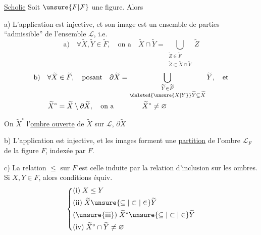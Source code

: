 \uline{Scholie}  Soit $\unsure{F|\mathcal F}$ une figure. Alors

a) L'application
est injective, et son image  est un ensemble de parties ``admissible'' de l'ensemble $\mathcal L$, i.e.
\[
\text{a)}\quad\forall\widetilde X,\widetilde Y\in\widetilde F,\quad\text{on a}\quad
\widetilde X\cap\widetilde Y=\bigcup_{\substack{\widetilde Z\in\widetilde F\\ \widetilde Z\subset\widetilde X\cap\widetilde Y}}\widetilde Z
\]
\[
\begin{aligned}
&\text{b)}\quad \forall\widetilde X\in\widetilde F,\quad\text{posant}\quad
\partial\widetilde X=\bigcup_{\substack{\widetilde Y\in\widetilde F\\ \deleted{\unsure{X|Y}}\widetilde Y\subsetneq\widetilde X}}\widetilde Y,\quad\text{et}\\
&\qquad\widetilde X^{\circ}=\widetilde X\setminus\partial\widetilde X,\quad\text{on a}\qquad\qquad \widetilde X^\circ\neq\varnothing
\end{aligned}
\]

On   $\widetilde X^\circ$ l'\uline{ombre ouverte} de $\widetilde X$ sur $\mathcal L$, $\partial\widetilde X$  

b) L'application
est injective, et  les images forment une \uline{partition} de l'ombre $\mathcal L_F$ de la figure $F$, indexée par $F$.

c)  La relation $\leq$ sur $F$ est celle induite par la relation d'inclusion sur les ombres. Si $X,Y\in F$, alors conditions équiv.
\[
\left\{\begin{aligned}
&\text{(i)}\;X\leq Y\\
&\text{(ii)}\;\widetilde X\unsure{\subseteq|\subset|\in}\widetilde Y\\
&\text{(\unsure{iii})}\;\widetilde X^\circ\unsure{\subseteq|\subset|\in}\widetilde Y\\
&\text{(iv)}\;\widetilde X^\circ\cap\widetilde Y\neq\varnothing
\end{aligned}\right.
\]
